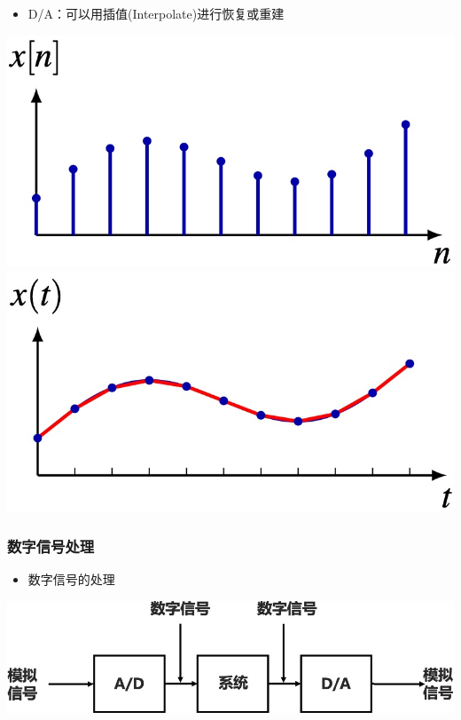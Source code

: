 \documentclass[CJKutf8,xcolor=pdftex,dvipsnames,table]{beamer}
\begin{document}
\begin{CJK*}{UTF8}{song}
\begin{frame}
\begin{center}
	    \end{center}    
    \begin{itemize}
    \item D/A：可以用插值(Interpolate)进行恢复或重建
    \end{itemize}
	    \begin{center}
	    	\includegraphics[scale=0.2]{dac1}  
			\hspace{1mm}
	    	\includegraphics[scale=0.2]{dac2}  
	    \end{center}
  \end{frame}  

  \begin{frame}
    \frametitle{数字信号处理}
    \begin{itemize}
    \item 数字信号的处理
    \end{itemize}
    \begin{center}
      \includegraphics[scale=.3]{dsp}
    \end{center}
  \end{frame}
  

\end{CJK*}
\end{document}
